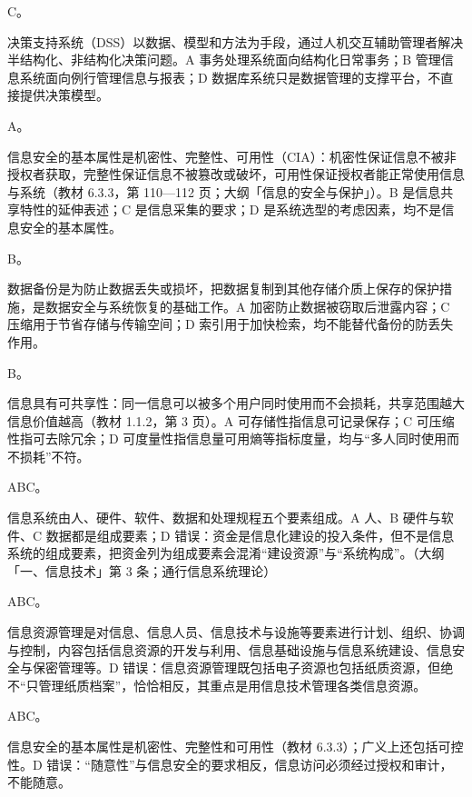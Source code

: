 \documentclass[a4paper,11pt]{article}
\begin{document}
\q C。\begin{analysis}决策支持系统（DSS）以数据、模型和方法为手段，通过人机交互辅助管理者解决半结构化、非结构化决策问题。A 事务处理系统面向结构化日常事务；B 管理信息系统面向例行管理信息与报表；D 数据库系统只是数据管理的支撑平台，不直接提供决策模型。\end{analysis}

\q A。\begin{analysis}信息安全的基本属性是机密性、完整性、可用性（CIA）：机密性保证信息不被非授权者获取，完整性保证信息不被篡改或破坏，可用性保证授权者能正常使用信息与系统（教材 6.3.3，第 110—112 页；大纲「信息的安全与保护」）。B 是信息共享特性的延伸表述；C 是信息采集的要求；D 是系统选型的考虑因素，均不是信息安全的基本属性。\end{analysis}

\q B。\begin{analysis}数据备份是为防止数据丢失或损坏，把数据复制到其他存储介质上保存的保护措施，是数据安全与系统恢复的基础工作。A 加密防止数据被窃取后泄露内容；C 压缩用于节省存储与传输空间；D 索引用于加快检索，均不能替代备份的防丢失作用。\end{analysis}

\q B。\begin{analysis}信息具有可共享性：同一信息可以被多个用户同时使用而不会损耗，共享范围越大信息价值越高（教材 1.1.2，第 3 页）。A 可存储性指信息可记录保存；C 可压缩性指可去除冗余；D 可度量性指信息量可用熵等指标度量，均与“多人同时使用而不损耗”不符。\end{analysis}


\q ABC。\begin{analysis}信息系统由人、硬件、软件、数据和处理规程五个要素组成。A 人、B 硬件与软件、C 数据都是组成要素；D 错误：资金是信息化建设的投入条件，但不是信息系统的组成要素，把资金列为组成要素会混淆“建设资源”与“系统构成”。（大纲「一、信息技术」第 3 条；通行信息系统理论）\end{analysis}

\q ABC。\begin{analysis}信息资源管理是对信息、信息人员、信息技术与设施等要素进行计划、组织、协调与控制，内容包括信息资源的开发与利用、信息基础设施与信息系统建设、信息安全与保密管理等。D 错误：信息资源管理既包括电子资源也包括纸质资源，但绝不“只管理纸质档案”，恰恰相反，其重点是用信息技术管理各类信息资源。\end{analysis}

\q ABC。\begin{analysis}信息安全的基本属性是机密性、完整性和可用性（教材 6.3.3）；广义上还包括可控性。D 错误：“随意性”与信息安全的要求相反，信息访问必须经过授权和审计，不能随意。\end{analysis}
\end{document}
